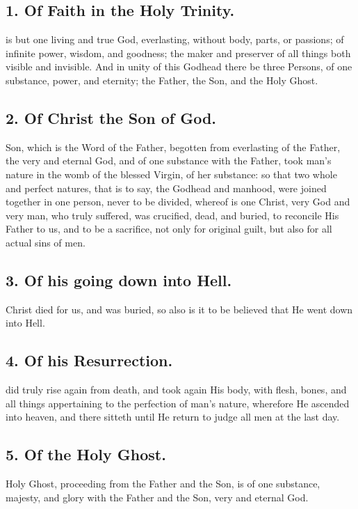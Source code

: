 \subsection{1.  Of Faith in the Holy Trinity.}
 is but one living and true God, everlasting, without body, parts, or passions; of infinite power, wisdom, and goodness; the maker and preserver of all things both visible and invisible. And in unity of this Godhead there be three Persons, of one substance, power, and eternity; the Father, the Son, and the Holy Ghost.

\subsection{2.  Of Christ the Son of God.}
 Son, which is the Word of the Father, begotten from everlasting of the Father, the very and eternal God, and of one substance with the Father, took man's nature in the womb of the blessed Virgin, of her substance: so that two whole and perfect natures, that is to say, the Godhead and manhood, were joined together in one person, never to be divided, whereof is one Christ, very God and very man, who truly suffered, was crucified, dead, and buried, to reconcile His Father to us, and to be a sacrifice, not only for original guilt, but also for all actual sins of men.

\subsection{3.  Of his going down into Hell.}
 Christ died for us, and was buried, so also is it to be believed that He went down into Hell.

\subsection{4.  Of his Resurrection.}
 did truly rise again from death, and took again His body, with flesh, bones, and all things appertaining to the perfection of man's nature, wherefore He ascended into heaven, and there sitteth until He return to judge all men at the last day.

\subsection{5.  Of the Holy Ghost.}
 Holy Ghost, proceeding from the Father and the Son, is of one substance, majesty, and glory with the Father and the Son, very and eternal God.

